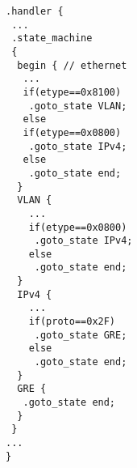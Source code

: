 \begin{lstlisting}[escapechar=@]
.handler {
 ...
 .state_machine
 {
  begin { // ethernet
   ...
   if(etype==0x8100)
    .goto_state VLAN;
   else 
   if(etype==0x0800)
    .goto_state IPv4;
   else
    .goto_state end;
  }
  VLAN {
    ...
    if(etype==0x0800)
     .goto_state IPv4;
    else
     .goto_state end;
  }
  IPv4 {
    ...
    if(proto==0x2F)
     .goto_state GRE;
    else
     .goto_state end;
  }
  GRE {
   .goto_state end;
  }
 }  
...
}

\end{lstlisting} 